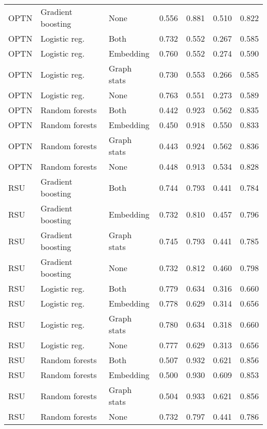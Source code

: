 \begin{tabular}{lllrrrr}
OPTN        &  Gradient boosting &         None &         0.556 &              0.881 &      0.510 &     0.822 \\
OPTN        &      Logistic reg. &         Both &         0.732 &              0.552 &      0.267 &     0.585 \\
OPTN        &      Logistic reg. &    Embedding &         0.760 &              0.552 &      0.274 &     0.590 \\
OPTN        &      Logistic reg. &  Graph stats &         0.730 &              0.553 &      0.266 &     0.585 \\
OPTN        &      Logistic reg. &         None &         0.763 &              0.551 &      0.273 &     0.589 \\
OPTN        &     Random forests &         Both &         0.442 &              0.923 &      0.562 &     0.835 \\
OPTN        &     Random forests &    Embedding &         0.450 &              0.918 &      0.550 &     0.833 \\
OPTN        &     Random forests &  Graph stats &         0.443 &              0.924 &      0.562 &     0.836 \\
OPTN        &     Random forests &         None &         0.448 &              0.913 &      0.534 &     0.828 \\
RSU         &  Gradient boosting &         Both &         0.744 &              0.793 &      0.441 &     0.784 \\
RSU         &  Gradient boosting &    Embedding &         0.732 &              0.810 &      0.457 &     0.796 \\
RSU         &  Gradient boosting &  Graph stats &         0.745 &              0.793 &      0.441 &     0.785 \\
RSU         &  Gradient boosting &         None &         0.732 &              0.812 &      0.460 &     0.798 \\
RSU         &      Logistic reg. &         Both &         0.779 &              0.634 &      0.316 &     0.660 \\
RSU         &      Logistic reg. &    Embedding &         0.778 &              0.629 &      0.314 &     0.656 \\
RSU         &      Logistic reg. &  Graph stats &         0.780 &              0.634 &      0.318 &     0.660 \\
RSU         &      Logistic reg. &         None &         0.777 &              0.629 &      0.313 &     0.656 \\
RSU         &     Random forests &         Both &         0.507 &              0.932 &      0.621 &     0.856 \\
RSU         &     Random forests &    Embedding &         0.500 &              0.930 &      0.609 &     0.853 \\
RSU         &     Random forests &  Graph stats &         0.504 &              0.933 &      0.621 &     0.856 \\
RSU         &     Random forests &         None &         0.732 &              0.797 &      0.441 &     0.786 \\
\bottomrule
\end{tabular}
